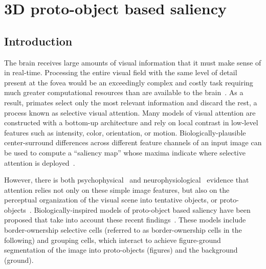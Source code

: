 \chapter{3D proto-object based saliency}
\label{sec:saliency}

\section{Introduction}

The brain receives large amounts of visual information that it must make sense of in real-time. Processing the entire visual field with the same level of detail present at the fovea would be an exceedingly complex and costly task requiring much greater computational resources than are available to the brain~\citep{Tsotsos90}. As a result, primates select only the most relevant information and discard the rest, a process known as selective visual attention.
%
%
Many models of visual attention are constructed with a bottom-up architecture and rely on local contrast in low-level features such as intensity, color, orientation, or motion. Biologically-plausible center-surround differences across different feature channels of an input image can be used to compute a ``saliency map'' whose maxima indicate where selective attention is deployed~\citep{Koch_Ullman85,Niebur_Koch96b,Itti_etal98a}.

However, there is both psychophysical~\citep{Einhauser_etal08a} and neurophysiological~\citep{Zhou_etal00, Qiu_etal07} evidence that attention relies not only on these simple image features, but also on the perceptual organization of the visual scene into tentative objects, or proto-objects~\citep{Rensink00a}. Biologically-inspired models of proto-object based saliency have been proposed that take into account these recent findings~\citep{Craft_etal07,Mihalas_etal11b,Russell_etal14}. These models include border-ownership selective cells (referred to as border-ownership cells in the following) and grouping cells, which interact to achieve figure-ground segmentation of the image into proto-objects (figures) and the background (ground).

